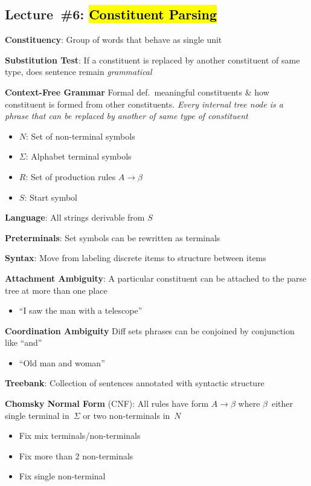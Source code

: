\documentclass[9pt]{extarticle}
\renewcommand{\green}[1]{{\color{ForestGreen} #1}}
\newcommand{\greenbf}[1]{\textbf{\green{#1}}}
\begin{document}
\begin{multicols}{3}
  \section*{Lecture~\#6: \hl{Constituent Parsing}}

  \greenbf{Constituency}: Group of words that behave as single unit

  \greenbf{Substitution Test}: If a constituent is replaced by another constituent of same type, does sentence remain \textit{grammatical}

  \greenbf{Context-Free Grammar} Formal def.\ meaningful constituents \& how constituent is formed from other constituents.  \textit{Every internal tree node is a phrase that can be replaced by another of same type of constituent}
  \begin{itemize}
    \item $N$: Set of non-terminal symbols
    \item $\Sigma$: Alphabet terminal symbols
    \item $R$: Set of production rules $A \rightarrow \beta$
    \item $S$: Start symbol
  \end{itemize}

  \textbf{Language}: All strings derivable from $S$

  \textbf{Preterminals}: Set symbols can be rewritten as terminals

  \textbf{Syntax}: Move from labeling discrete items to structure between items

  \greenbf{Attachment Ambiguity}: A particular constituent can be attached to the parse tree at more than one place
  \begin{itemize}
    \item ``I saw the man with a telescope''
  \end{itemize}

  \greenbf{Coordination Ambiguity} Diff sets phrases can be conjoined by conjunction like ``and''
  \begin{itemize}
    \item ``Old man and woman''
  \end{itemize}

  \greenbf{Treebank}: Collection of sentences annotated with syntactic structure

  \greenbf{Chomsky Normal Form} (CNF): All rules have form ${A \rightarrow \beta}$ where $\beta$~either single terminal in~$\Sigma$ or two non-terminals in~$N$
  \begin{itemize}
    \item Fix mix terminals/non-terminals
    \item Fix more than 2 non-terminals
    \item Fix single non-terminal
  \end{itemize}


\end{multicols}
\end{document}
